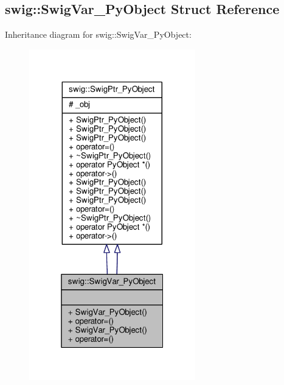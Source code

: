 \subsection{swig\+:\+:Swig\+Var\+\_\+\+Py\+Object Struct Reference}
\label{structswig_1_1SwigVar__PyObject}


Inheritance diagram for swig\+:\+:Swig\+Var\+\_\+\+Py\+Object\+:
\nopagebreak
\begin{figure}[H]
\begin{center}
\leavevmode
\includegraphics[width=205pt]{df/d21/structswig_1_1SwigVar__PyObject__inherit__graph}
\end{center}
\end{figure}


